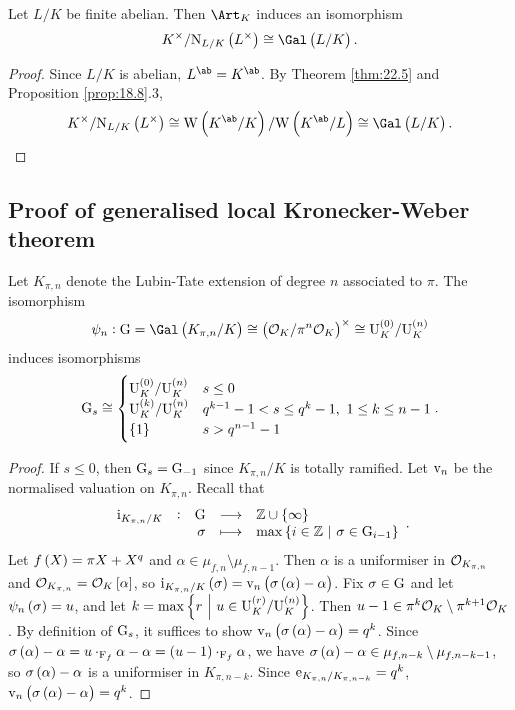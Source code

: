 \begin{corollary}
Let $ L / K $ be finite abelian. Then $ \Art_K $ induces an isomorphism
$$ K^\times / \N_{L / K}\br{L^\times} \cong \Gal\br{L / K}. $$
\end{corollary}

\begin{proof}
Since $ L / K $ is abelian, $ L^{\ab} = K^{\ab} $. By Theorem \ref{thm:22.5} and Proposition \ref{prop:18.8}.$ 3 $,
$$ K^\times / \N_{L / K}\br{L^\times} \cong \W\br{K^{\ab} / K} / \W\br{K^{\ab} / L} \cong \Gal\br{L / K}. $$
\end{proof}

\subsection{Proof of generalised local Kronecker-Weber theorem}


\begin{proposition}
Let $ K_{\pi, n} $ denote the Lubin-Tate extension of degree $ n $ associated to $ \pi $. The isomorphism
$$ \psi_n : \G = \Gal\br{K_{\pi, n} / K} \cong \br{\OOO_K / \pi^n\OOO_K}^\times \cong \U_K^{\br{0}} / \U_K^{\br{n}} $$
induces isomorphisms
$$ \G_s \cong
\begin{cases}
\U_K^{\br{0}} / \U_K^{\br{n}} & s \le 0 \\
\U_K^{\br{k}} / \U_K^{\br{n}} & q^{k - 1} - 1 < s \le q^k - 1, \ 1 \le k \le n - 1 \\
\cbr{1} & s > q^{n - 1} - 1
\end{cases}.
$$
\end{proposition}

\begin{proof}
If $ s \le 0 $, then $ \mathrm{G}_s = \mathrm{G}_{-1} $ since $ K_{\pi, n} / K $ is totally ramified. Let $ \mathrm{v}_n $ be the normalised valuation on $ K_{\pi, n} $. Recall that
$$ \function[\i_{K_{\pi, n} / K}]{\G}{\ZZ \cup \cbr{\infty}}{\sigma}{\max \cbr{i \in \ZZ \st \sigma \in \G_{i - 1}}}. $$
Let $ f\br{X} = \pi X + X^q $ and $ \alpha \in \mu_{f, n} \setminus \mu_{f, n - 1} $. Then $ \alpha $ is a uniformiser in $ \mathcal{O}_{K_{\pi, n}} $ and $ \OOO_{K_{\pi, n}} = \OOO_K\sbr{\alpha} $, so $ \i_{K_{\pi, n} / K}\br{\sigma} = \v_n\br{\sigma\br{\alpha} - \alpha} $. Fix $ \sigma \in \mathrm{G} $ and let $ \psi_n\br{\sigma} = u $, and let $ k = \max \cbr{r \st u \in \U_K^{\br{r}} / \U_K^{\br{n}}} $. Then $ u - 1 \in \pi^k\mathcal{O}_K \setminus \pi^{k + 1}\mathcal{O}_K $. By definition of $ \mathrm{G}_s $, it suffices to show $ \v_n\br{\sigma\br{\alpha} - \alpha} = q^k $. Since $ \sigma\br{\alpha} - \alpha = u \cdot_{\F_f} \alpha - \alpha = \br{u - 1} \cdot_{\F_f} \alpha $, we have $ \sigma\br{\alpha} - \alpha \in \mu_{f, n - k} \setminus \mu_{f, n - k - 1} $, so $ \sigma\br{\alpha} - \alpha $ is a uniformiser in $ K_{\pi, n - k} $. Since $ \mathrm{e}_{K_{\pi, n} / K_{\pi, n - k}} = q^k $, $ \v_n\br{\sigma\br{\alpha} - \alpha} = q^k $.
\end{proof}

